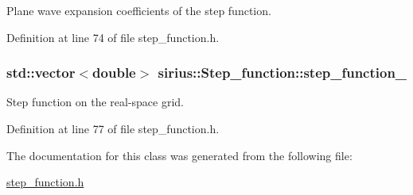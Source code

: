 Plane wave expansion coefficients of the step function. 



Definition at line 74 of file step\+\_\+function.\+h.

\hypertarget{classsirius_1_1_step__function_a811fd3e1fe15e4e66820cbee8dba05a8}{}
\subsubsection[{step\+\_\+function\+\_\+}]{\setlength{\rightskip}{0pt plus 5cm}std\+::vector$<$double$>$ sirius\+::\+Step\+\_\+function\+::step\+\_\+function\+\_\+\hspace{0.3cm}{\ttfamily [private]}}\label{classsirius_1_1_step__function_a811fd3e1fe15e4e66820cbee8dba05a8}


Step function on the real-\/space grid. 



Definition at line 77 of file step\+\_\+function.\+h.



The documentation for this class was generated from the following file\+:\begin{DoxyCompactItemize}
\item 
\hyperlink{step__function_8h}{step\+\_\+function.\+h}\end{DoxyCompactItemize}
